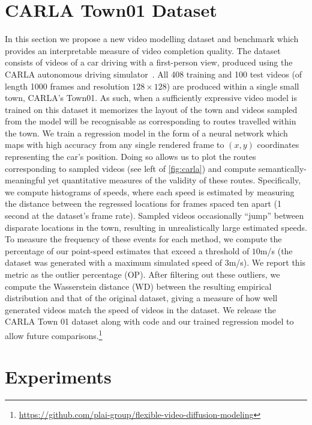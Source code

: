 \section{CARLA Town01 Dataset}
\label{sec:fdm-carla}
In this section we propose a new video modelling dataset and benchmark which provides an interpretable measure of video completion quality. The dataset consists of videos of a car driving with a first-person view, produced using the CARLA autonomous driving simulator~\cite{dosovitskiy2017carla}. All 408 training and 100 test videos (of length 1000 frames and resolution $128\times128$) are produced within a single small town, CARLA's Town01. As such, when a sufficiently expressive video model is trained on this dataset it memorizes the layout of the town and videos sampled from the model will be recognisable as corresponding to routes travelled within the town. We train a regression model in the form of a neural network which maps with high accuracy from any single rendered frame to $(x,y)$ coordinates representing the car's position. Doing so allows us to plot the routes corresponding to sampled videos (see left of \cref{fig:carla}) and compute semantically-meaningful yet quantitative measures of the validity of these routes. Specifically, we compute histograms of speeds, where each speed is estimated by measuring the distance between the regressed locations for frames spaced ten apart (1 second at the dataset's frame rate). Sampled videos occasionally ``jump'' between disparate locations in the town, resulting in unrealistically large estimated speeds. To measure the frequency of these events for each method, we compute the percentage of our point-speed estimates that exceed a threshold of $10$m/s (the dataset was generated with a maximum simulated speed of $3$m/s). We report this metric as the outlier percentage (OP). After filtering out these outliers, we compute the Wasserstein distance (WD) between the resulting empirical distribution and that of the original dataset, giving a measure of how well generated videos match the speed of videos in the dataset. We release the CARLA Town 01 dataset along with code and our trained regression model to allow future comparisons.\footnote{\url{https://github.com/plai-group/flexible-video-diffusion-modeling}}

\section{Experiments} \label{sec:fdm-experiments}




